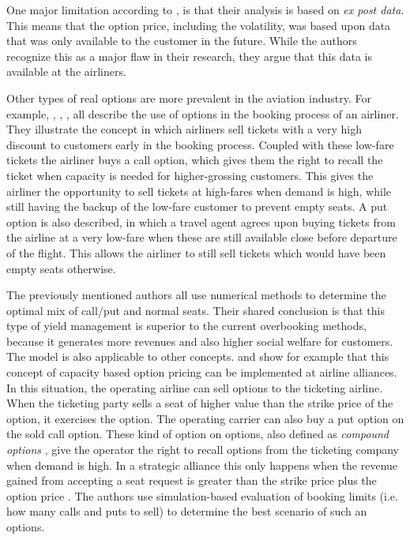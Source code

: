 One major limitation according to , is that their analysis is based on \emph{ex post data}. This means that the option price, including the volatility, was based upon data that was only available to the customer in the future. While the authors recognize this as a major flaw in their research, they argue that this data is available at the airliners.

Other types of real options are more prevalent in the aviation industry. For example, , , , all describe the use of options in the booking process of an airliner. They illustrate the concept in which airliners sell tickets with a very high discount to customers early in the booking process. Coupled with these low-fare tickets the airliner buys a call option, which gives them the right to recall the ticket when capacity is needed for higher-grossing customers. This gives the airliner the opportunity to sell tickets at high-fares when demand is high, while still having the backup of the low-fare customer to prevent empty seats. A put option is also described, in which a travel agent agrees upon buying tickets from the airline at a very low-fare when these are still available close before departure of the flight. This allows the airliner to still sell tickets which would have been empty seats otherwise.

The previously mentioned authors all use numerical methods to determine the optimal mix of call/put and normal seats. Their shared conclusion is that this type of yield management is superior to the current overbooking methods, because it generates more revenues and also higher social welfare for customers. The model is also applicable to other concepts.  and  show for example that this concept of capacity based option pricing can be implemented at airline alliances. In this situation, the operating airline can sell options to the ticketing airline. When the ticketing party sells a seat of higher value than the strike price of the option, it exercises the option. The operating carrier can also buy a put option on the sold call option. These kind of option on options, also defined as \emph{compound options} \cite{trigeorgis1996real}, give the operator the right to recall options from the ticketing company when demand is high. In a strategic alliance this only happens when the revenue gained from accepting a seat request is greater than the strike price plus the option price . The authors use simulation-based evaluation of booking limits (i.e. how many calls and puts to sell) to determine the best scenario of such an options.

